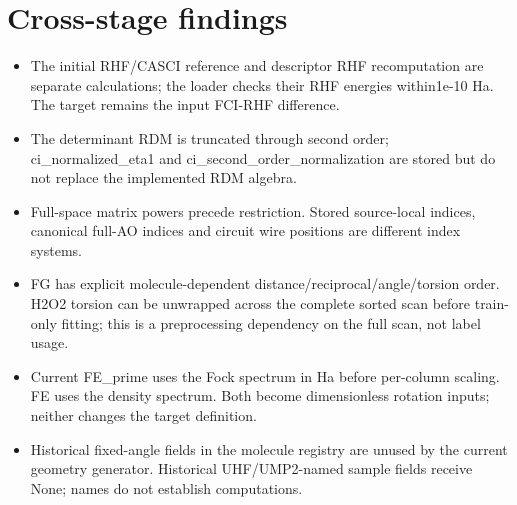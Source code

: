 \documentclass[10pt,a4paper]{article}
\begin{document}
\clearpage\section*{Cross-stage findings}
\begin{itemize}
\item The initial RHF/CASCI reference and descriptor RHF recomputation are separate calculations; the loader checks their RHF energies within1e-10 Ha. The target remains the input FCI-RHF difference.
\item The determinant RDM is truncated through second order; ci\_normalized\_eta1 and ci\_\allowbreak second\_\allowbreak order\_\allowbreak normalization are stored but do not replace the implemented RDM algebra.
\item Full-space matrix powers precede restriction. Stored source-local indices, canonical full-AO indices and circuit wire positions are different index systems.
\item FG has explicit molecule-dependent distance/reciprocal/angle/torsion order. H2O2 torsion can be unwrapped across the complete sorted scan before train-only fitting; this is a preprocessing dependency on the full scan, not label usage.
\item Current FE\_prime uses the Fock spectrum in Ha before per-column scaling. FE uses the density spectrum. Both become dimensionless rotation inputs; neither changes the target definition.
\item Historical fixed-angle fields in the molecule registry are unused by the current geometry generator. Historical UHF/UMP2-named sample fields receive None; names do not establish computations.
\end{itemize}
\end{document}
